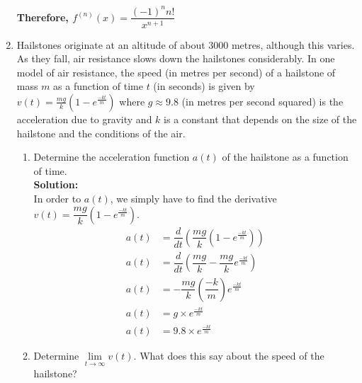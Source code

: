 \documentclass[12pt]{book}
\begin{document}
\begin{enumerate}
\textbf{Therefore, $f^{(n)}(x) = \dfrac{(-1)^n n!}{x^{n+1}}$}



\newpage


\item Hailstones originate at an altitude of about 3000 metres, although this varies. As they fall, air resistance slows down the hailstones considerably. In one model of air resistance, the speed (in metres per second) of a hailstone of mass $m$ as a function of time $t$ (in seconds) is given by $v(t) = \frac{mg}{k} (1 - e^{\frac{-kt}{m}})$ where $g \approx 9.8$ (in metres per second squared) is the acceleration due to gravity and $k$ is a constant that depends on the size of the hailstone and the conditions of the air. 

\begin{enumerate}
\item Determine the acceleration function $a(t)$ of the hailstone as a function of time.\\

\textbf{Solution:}\\
In order to $a(t)$, we simply have to find the derivative $v(t) = \dfrac{mg}{k}\left( 1 - e^{\frac{-kt}{m}} \right)$.
\setcounter{equation}{0}
\begingroup
\addtolength{\jot}{0.5em}
\begin{align}
    a(t) &= \dfrac{d}{dt} \left(\dfrac{mg}{k}\left( 1 - e^{\frac{-kt}{m}} \right) \right) \\
    a(t) &= \dfrac{d}{dt} \left( \dfrac{mg}{k} - \dfrac{mg}{k}e^{\frac{-kt}{m}} \right) \\
    a(t) &= - \dfrac{mg}{k} \left( \dfrac{-k}{m} \right)e^{\frac{-kt}{m}} \\
    a(t) &= g \times e^{\frac{-kt}{m}} \\
    a(t) &= 9.8 \times e^{\frac{-kt}{m}}
\end{align}
\endgroup



\item Determine $\lim\limits_{t\to \infty} v(t)$. What does this say about the speed of the hailstone?\\


\end{enumerate}
\end{enumerate}
\end{document}
